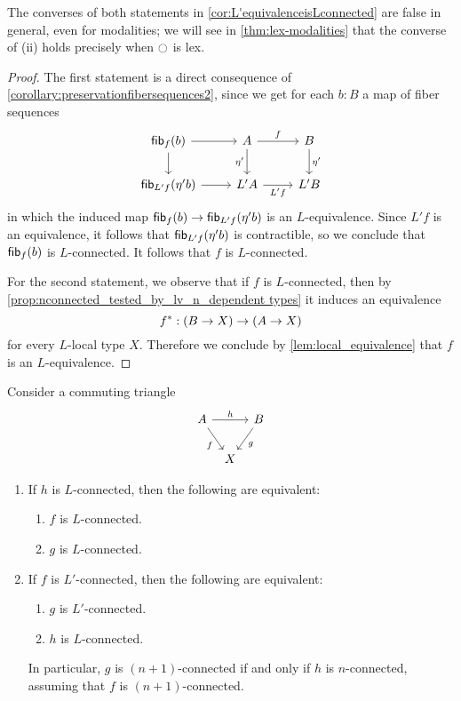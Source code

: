 The converses of both statements in \cref{cor:L'equivalenceisLconnected} are false in general, even for modalities; we will see in \cref{thm:lex-modalities} that the converse of (ii) holds precisely when ${\ocircle}$ is lex.

\begin{proof}
The first statement is a direct consequence of \cref{corollary:preservationfibersequences2}, since we get for each $b:B$ a map of fiber sequences
\begin{equation*}
\begin{tikzcd}
\fib{f}{b} \arrow[r] \arrow[d] & A \arrow[r,"f"] \arrow[d,swap,"\eta'"] & B \arrow[d,"\eta'"] \\
\fib{L'f}{\eta'b} \arrow[r] & L'A \arrow[r,swap,"L'f"] & L'B
\end{tikzcd}
\end{equation*}
in which the induced map $\mathsf{fib}_{f}(b)\to\mathsf{fib}_{L'f}(\eta'b)$ is an $L$-equivalence. Since $L'f$ is an equivalence, it follows that $\mathsf{fib}_{L'f}(\eta'b)$ is contractible, so we conclude that $\mathsf{fib}_{f}(b)$ is $L$-connected. It follows that $f$ is $L$-connected.

For the second statement, we observe that if $f$ is $L$-connected, then by \cref{prop:nconnected_tested_by_lv_n_dependent types} it induces an equivalence
\begin{equation*}
{f}^\ast : (B\to X)\to (A\to X)
\end{equation*}
for every $L$-local type $X$. Therefore we conclude by \cref{lem:local_equivalence} that $f$ is an $L$-equivalence.
\end{proof}

\begin{prp}\label{thm:rsu-compose-cancel} %
Consider a commuting triangle
\begin{equation*}
\begin{tikzcd}[column sep=tiny]
A \arrow[rr,"h"] \arrow[dr,swap,"f"] & & B \arrow[dl,"g"] \\
& X
\end{tikzcd}
\end{equation*}
\begin{enumerate}
\item If $h$ is $L$-connected, then the following are equivalent:
\begin{enumerate}
\item $f$ is $L$-connected.
\item $g$ is $L$-connected.
\end{enumerate}
\item If $f$ is $L'$-connected, then the following are equivalent:
\begin{enumerate}
\item $g$ is $L'$-connected.
\item $h$ is $L$-connected.
\end{enumerate}
In particular, $g$ is $(n+1)$-connected if and only if $h$ is $n$-connected, assuming that $f$ is $(n+1)$-connected.
\end{enumerate}
\end{prp}

